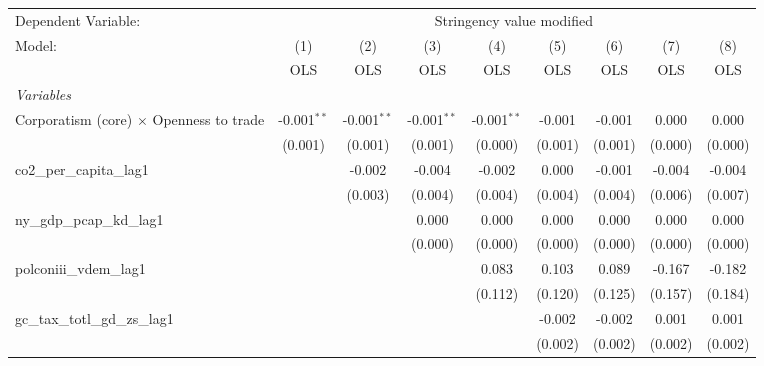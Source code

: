
\begingroup
\centering
\begin{tabular}{lcccccccc}
   \toprule
   Dependent Variable: & \multicolumn{8}{c}{Stringency value modified}\\
   Model:                                         & (1)           & (2)           & (3)           & (4)           & (5)     & (6)     & (7)          & (8)\\  
                                                  &  OLS          & OLS           & OLS           & OLS           & OLS     & OLS     & OLS          & OLS\\  
   \midrule
   \emph{Variables}\\
   Corporatism (core) $\times$ Openness to trade  & -0.001$^{**}$ & -0.001$^{**}$ & -0.001$^{**}$ & -0.001$^{**}$ & -0.001  & -0.001  & 0.000        & 0.000\\   
                                                  & (0.001)       & (0.001)       & (0.001)       & (0.000)       & (0.001) & (0.001) & (0.000)      & (0.000)\\   
   co2\_per\_capita\_lag1                         &               & -0.002        & -0.004        & -0.002        & 0.000   & -0.001  & -0.004       & -0.004\\   
                                                  &               & (0.003)       & (0.004)       & (0.004)       & (0.004) & (0.004) & (0.006)      & (0.007)\\   
   ny\_gdp\_pcap\_kd\_lag1                        &               &               & 0.000         & 0.000         & 0.000   & 0.000   & 0.000        & 0.000\\   
                                                  &               &               & (0.000)       & (0.000)       & (0.000) & (0.000) & (0.000)      & (0.000)\\   
   polconiii\_vdem\_lag1                          &               &               &               & 0.083         & 0.103   & 0.089   & -0.167       & -0.182\\   
                                                  &               &               &               & (0.112)       & (0.120) & (0.125) & (0.157)      & (0.184)\\   
   gc\_tax\_totl\_gd\_zs\_lag1                    &               &               &               &               & -0.002  & -0.002  & 0.001        & 0.001\\   
                                                  &               &               &               &               & (0.002) & (0.002) & (0.002)      & (0.002)\\   

\end{tabular}
